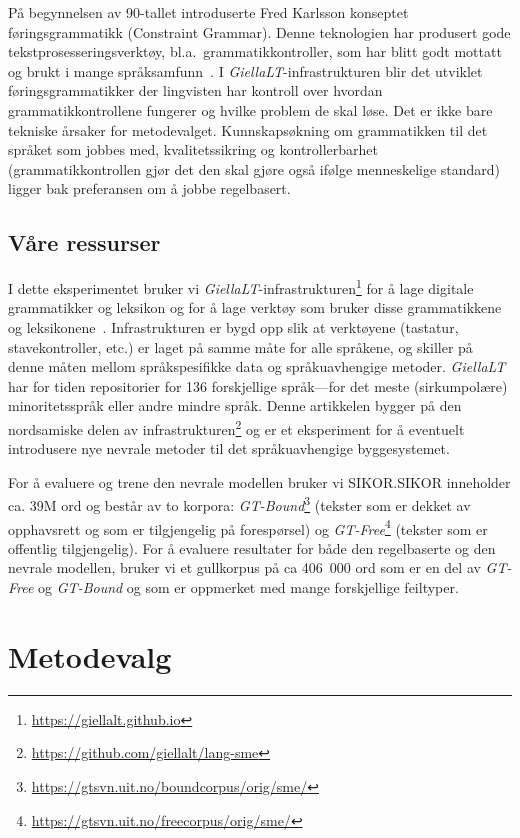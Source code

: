 \documentclass{flammie}
\begin{document}
På begynnelsen av 90-tallet introduserte Fred Karlsson konseptet
føringsgrammatikk (Constraint Grammar).  Denne teknologien har produsert gode
tekstprosesseringsverktøy, bl.a.\ grammatikkontroller, som har blitt godt mottatt
og brukt i mange språksamfunn~\cite{Arppe2000ei,Birn2000detecting,Hagen2001det}.
I \textit{GiellaLT}-infrastrukturen blir det utviklet føringsgrammatikker der
lingvisten har kontroll over hvordan grammatikkontrollene fungerer og hvilke
problem de skal løse. Det er ikke bare tekniske årsaker for metodevalget.
Kunnskapsøkning om grammatikken til det språket som jobbes med, kvalitetssikring
og kontrollerbarhet (grammatikkontrollen gjør det den skal gjøre også ifølge
menneskelige standard) ligger bak preferansen om å jobbe regelbasert.

\subsection{Våre ressurser}

I dette eksperimentet bruker vi
\textit{GiellaLT}-infrastrukturen\footnote{\url{https://giellalt.github.io}} for
å lage digitale grammatikker og leksikon og for å lage verktøy som bruker disse
grammatikkene og leksikonene~\cite{moshagen2014open}.  Infrastrukturen er bygd
opp slik at verktøyene  (tastatur, stavekontroller, etc.) er laget på samme måte
for alle språkene, og skiller på denne måten mellom språkspesifikke data og
språkuavhengige metoder.  \textit{GiellaLT} har for tiden repositorier for 136
forskjellige språk---for det meste (sirkumpolære) minoritetsspråk eller andre
mindre språk.  Denne artikkelen bygger på den nordsamiske delen av
infrastrukturen\footnote{\url{https://github.com/giellalt/lang-sme}} og er et
eksperiment for å eventuelt introdusere nye nevrale metoder til det
språkuavhengige byggesystemet.

For å evaluere og trene den nevrale modellen bruker vi SIKOR.\@  SIKOR inneholder
ca. 39M ord og består av to korpora:
\textit{GT-Bound}\footnote{\url{https://gtsvn.uit.no/boundcorpus/orig/sme/}}
(tekster som er dekket av opphavsrett og som er tilgjengelig på forespørsel) og
\textit{GT-Free}\footnote{\url{https://gtsvn.uit.no/freecorpus/orig/sme/}}
(tekster som er offentlig tilgjengelig).  For å evaluere resultater for både den
regelbaserte og den nevrale modellen, bruker vi et gullkorpus på ca 406~000 ord
som er en del av \textit{GT-Free} og \textit{GT-Bound} og som er oppmerket med
mange forskjellige feiltyper.


\section{Metodevalg}
\end{document}

